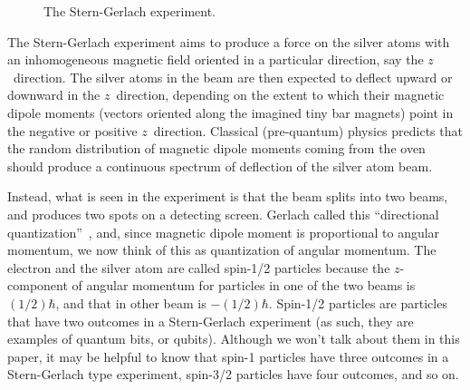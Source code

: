 \documentclass[12pt]{article}
\begin{document}
\begin{figure}
  \begin{center}
  \end{center}
\caption{The Stern-Gerlach experiment.}
\label{sterngerlach}
\end{figure}

The Stern-Gerlach experiment aims to produce a force on the silver atoms
with an inhomogeneous magnetic field oriented in a particular direction,
say the $z$~direction.  The silver atoms in the beam are then expected
to deflect upward or downward in the $z$~direction, depending on the extent
to which their magnetic dipole moments (vectors oriented along the imagined
tiny bar magnets) point in the negative or positive $z$~direction.
Classical (pre-quantum) physics predicts that the random distribution of
magnetic dipole moments coming from the oven should produce a continuous
spectrum of deflection of the silver atom beam.

Instead, what is seen in the experiment is that the beam splits into
two beams, and produces two spots on a detecting screen.
Gerlach called this ``directional quantization''~\cite{townsend},
and, since magnetic dipole moment is proportional to angular momentum,
we now think of this as quantization of angular momentum.
The electron and the silver atom are called spin-1/2 particles
because the $z$-component of
angular momentum for particles in one of the two beams is $(1/2)\hbar$,
and that in other beam is $-(1/2)\hbar$.
Spin-1/2 particles are particles that have two outcomes in a Stern-Gerlach
experiment (as such, they are examples of quantum bits, or qubits).
Although we won't talk about them in this paper, it may be helpful
to know that spin-1 particles have three outcomes in a Stern-Gerlach type
experiment, spin-3/2 particles have four outcomes, and so on.
\end{document}
